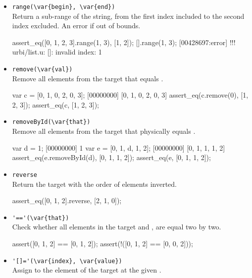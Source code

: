 \begin{itemize}
\item \lstinline|range(\var{begin}, \var{end})|\\
Return a sub-range of the string, from the first index included to the
second index excluded. An error if out of bounds.

\begin{urbiscript}[firstnumber=last]
assert_eq([0, 1, 2, 3].range(1, 3), [1, 2]);
[].range(1, 3);
[00428697:error] !!! urbi/list.u: []: invalid index: 1
\end{urbiscript}


\item \lstinline|remove(\var{val})|\\
Remove all elements from the target that equals .

\begin{urbiscript}[firstnumber=last]
var c = [0, 1, 0, 2, 0, 3];
[00000000] [0, 1, 0, 2, 0, 3]
assert_eq(c.remove(0), [1, 2, 3]);
assert_eq(c, [1, 2, 3]);
\end{urbiscript}

\item \lstinline|removeById(\var{that})|\\
Remove all elements from the target that physically equals .

\begin{urbiscript}[firstnumber=last]
var d = 1;
[00000000] 1
var e = [0, 1, d, 1, 2];
[00000000] [0, 1, 1, 1, 2]
assert_eq(e.removeById(d), [0, 1, 1, 2]);
assert_eq(e, [0, 1, 1, 2]);
\end{urbiscript}

\item \lstinline|reverse|\\
Return the target with the order of elements inverted.

\begin{urbiscript}[firstnumber=last]
assert_eq([0, 1, 2].reverse, [2, 1, 0]);
\end{urbiscript}

\item \lstinline|'=='(\var{that})|\\
Check whether all elements in the target and , are
equal two by two.

\begin{urbiscript}[firstnumber=last]
assert([0, 1, 2] == [0, 1, 2]);
assert(!([0, 1, 2] == [0, 0, 2]));
\end{urbiscript}

\item \lstinline|'[]='(\var{index}, \var{value})|\\
\label{sec:std-list-setnth}
Assign  to the element of the target at the given .


\end{itemize}
